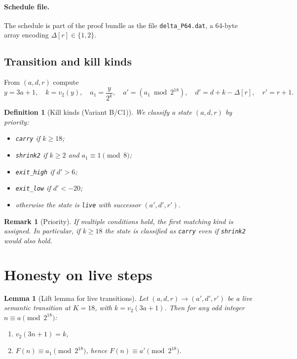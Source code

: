 \documentclass[11pt]{article}
\newtheorem{lemma}{Lemma}
\newtheorem{definition}{Definition}
\newtheorem{remark}{Remark}
\begin{document}
\paragraph{Schedule file.}
The schedule is part of the proof bundle as the file \texttt{delta\_P64.dat}, a 64-byte array encoding
$\Delta[r]\in\{1,2\}$.

\subsection{Transition and kill kinds}

From $(a,d,r)$ compute
\[
y=3a+1,\quad k=v_2(y),\quad a_1=\frac{y}{2^k},\quad a'=(a_1\bmod 2^{18}),\quad d'=d+k-\Delta[r],\quad r'=r+1.
\]

\begin{definition}[Kill kinds (Variant B/C1)]
We classify a state $(a,d,r)$ by priority:
\begin{itemize}
\item \texttt{carry} if $k\ge 18$;
\item \texttt{shrink2} if $k\ge 2$ and $a_1\equiv 1\pmod 8$;
\item \texttt{exit\_high} if $d'>6$;
\item \texttt{exit\_low} if $d'<-20$;
\item otherwise the state is \texttt{live} with successor $(a',d',r')$.
\end{itemize}
\end{definition}

\begin{remark}[Priority]
If multiple conditions hold, the first matching kind is assigned. In particular, if $k\ge 18$ the state is classified as
\texttt{carry} even if \texttt{shrink2} would also hold.
\end{remark}

\section{Honesty on live steps}

\begin{lemma}[Lift lemma for live transitions]
\label{lem:lift-live}
Let $(a,d,r)\to(a',d',r')$ be a \emph{live} semantic transition at $K=18$, with $k=v_2(3a+1)$.
Then for any odd integer $n\equiv a\pmod{2^{18}}$:
\begin{enumerate}
\item $v_2(3n+1)=k$,
\item $F(n)\equiv a_1 \pmod{2^{18}}$, hence $F(n)\equiv a' \pmod{2^{18}}$.
\end{enumerate}
\end{lemma}
\end{document}
